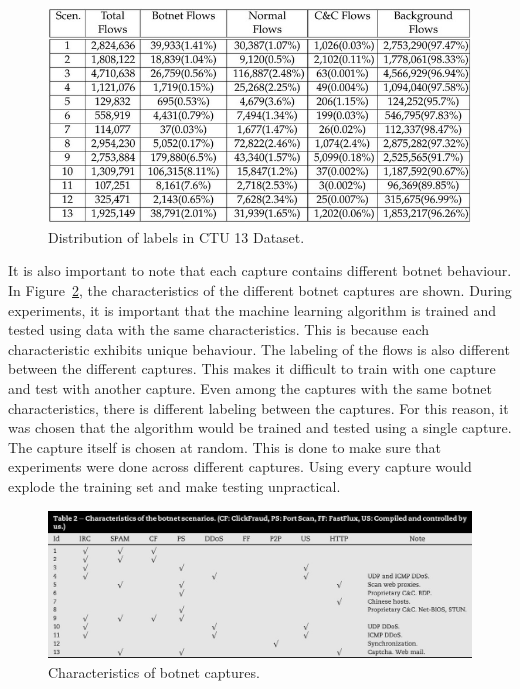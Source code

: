  \begin{figure}[H]
\centering
\includegraphics[width=1\textwidth]{Figures/ctu13-1}
\decoRule
\caption[Distribution of labels in CTU 13 Dataset]{Distribution of labels in CTU 13 Dataset. \cite{garcia2014empirical}}
\label{fig:ctu13-1}
\end{figure}

\noindent It is also important to note that each capture contains different botnet behaviour. In Figure~\ref{fig:ctu13-3}, the characteristics of the different botnet captures are shown. During experiments, it is important that the machine learning algorithm is trained and tested using data with the same characteristics. This is because each characteristic exhibits unique behaviour. The labeling of the flows is also different between the different captures. This makes it difficult to train with one capture and test with another capture. Even among the captures with the same botnet characteristics, there is different labeling between the captures. For this reason, it was chosen that the algorithm would be trained and tested using a single capture. The capture itself is chosen at random. This is done to make sure that experiments were done across different captures. Using every capture would explode the training set and make testing unpractical.

 \begin{figure}[H]
\centering
\includegraphics[width=1\textwidth]{Figures/ctu13-3}
\decoRule
\caption[Characteristics of botnet scenarios]{Characteristics of botnet captures. \cite{garcia2014empirical}}
\label{fig:ctu13-3}
\end{figure}

